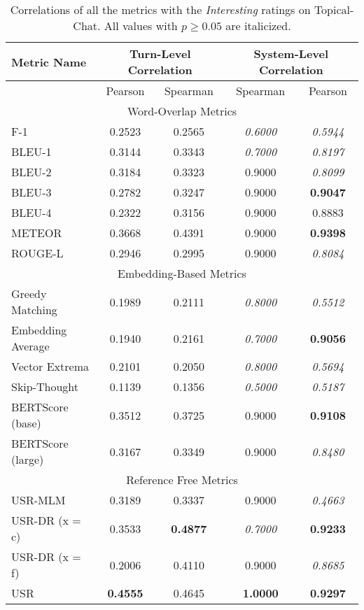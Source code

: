 \documentclass[11pt,a4paper]{article}
\begin{document}
\begin{table*}
    \centering
    \renewcommand*{\arraystretch}{1.2}
    \begin{tabular}{|l|c|c|c|c|}
    \hline
        \textbf{Metric Name} & \multicolumn{2}{|c|}{\textbf{Turn-Level Correlation}} & \multicolumn{2}{|c|}{\textbf{System-Level Correlation}}  \\ \hline
         & Pearson & Spearman & Spearman & Pearson \\ \hline
         \multicolumn{5}{|c|}{Word-Overlap Metrics} \\ \hline
F-1 & 0.2523 & 0.2565 & \textit{0.6000} & \textit{0.5944} \\
BLEU-1 & 0.3144 & 0.3343 & \textit{0.7000} & \textit{0.8197} \\
BLEU-2 & 0.3184 & 0.3323 & 0.9000 & \textit{0.8099} \\
BLEU-3 & 0.2782 & 0.3247 & 0.9000 & \textbf{0.9047} \\
BLEU-4 & 0.2322 & 0.3156 & 0.9000 & 0.8883 \\
METEOR & 0.3668 & 0.4391 & 0.9000 & \textbf{0.9398} \\
ROUGE-L & 0.2946 & 0.2995 & 0.9000 & \textit{0.8084} \\ \hline
\multicolumn{5}{|c|}{Embedding-Based Metrics} \\ \hline
Greedy Matching & 0.1989 & 0.2111 & \textit{0.8000} & \textit{0.5512} \\
Embedding Average & 0.1940 & 0.2161 & \textit{0.7000} & \textbf{0.9056} \\
Vector Extrema & 0.2101 & 0.2050 & \textit{0.8000} & \textit{0.5694} \\
Skip-Thought & 0.1139 & 0.1356 & \textit{0.5000} & \textit{0.5187} \\
BERTScore (base) & 0.3512 & 0.3725 & 0.9000 & \textbf{0.9108} \\
BERTScore (large) & 0.3167 & 0.3349 & 0.9000 & \textit{0.8480} \\ \hline
\multicolumn{5}{|c|}{Reference Free Metrics} \\ \hline
USR-MLM & 0.3189 & 0.3337 & 0.9000 & \textit{0.4663} \\
USR-DR (x = c) & 0.3533 & \textbf{0.4877} & \textit{0.7000} & \textbf{0.9233} \\
USR-DR (x = f) & 0.2006 & 0.4110 & 0.9000 & \textit{0.8685} \\
USR & \textbf{0.4555} & 0.4645 & \textbf{1.0000} & \textbf{0.9297} \\  \hline
    \end{tabular}
    \caption{Correlations of all the metrics with the \textit{Interesting} ratings on Topical-Chat. All values with $p \geq 0.05$ are italicized.}
    
\end{table*}
\end{document}
